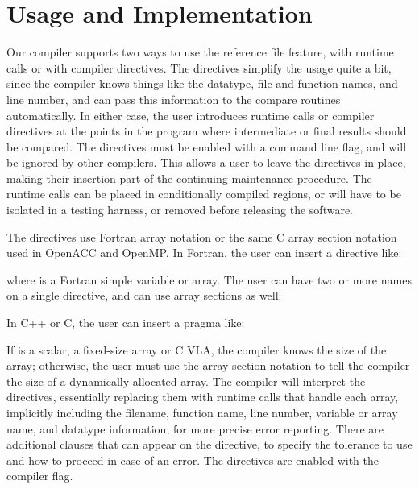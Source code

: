 \section{Usage and Implementation}

Our compiler supports two ways to use the reference file feature, with runtime calls or with compiler directives.
The directives simplify the usage quite a bit, since the compiler knows things like the datatype, file and function names, and line number, and can pass this information to the compare routines automatically.
In either case, the user introduces runtime calls or compiler directives at the points in the program where intermediate or final results should be compared.
The directives must be enabled with a command line flag, and will be ignored by other compilers.
This allows a user to leave the directives in place, making their insertion part of the continuing maintenance procedure.
The runtime calls can be placed in conditionally compiled regions, or will have to be isolated in a testing harness, or removed before releasing the software.

The directives use Fortran array notation or the same C array section notation used in OpenACC and OpenMP.
In Fortran, the user can insert a directive like:
\begin{otabbing}
\>
\end{otabbing}
where  is a Fortran simple variable or array.
The user can have two or more names on a single directive, and can use array sections as well:
\begin{otabbing}
\>
\end{otabbing}
In C++ or C, the user can insert a pragma like:
\begin{otabbing}
\>
\end{otabbing}
If  is a scalar, a fixed-size array or C VLA, the compiler knows the size of the array; otherwise, the user must use the array section notation to tell the compiler the size of a dynamically allocated array.
The compiler will interpret the directives, essentially replacing them with runtime calls that handle each array, implicitly including the filename, function name, line number, variable or array name, and datatype information, for more precise error reporting.
There are additional clauses that can appear on the directive, to specify the tolerance to use and how to proceed in case of an error.
The directives are enabled with the  compiler flag.

